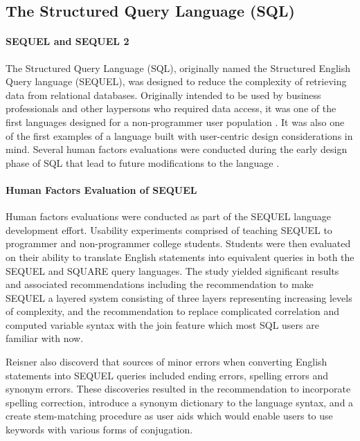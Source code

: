 \subsection{The Structured Query Language (SQL)}


\paragraph{SEQUEL and SEQUEL 2}
\cite{Chamberlin1974}
\cite{Astrahan1975}
The Structured Query Language (SQL), originally named the Structured English Query language (SEQUEL), was designed to reduce the complexity of retrieving data from relational databases. Originally intended to be used by business professionals and other laypersons who required data access, it was one of the first languages designed for a non-programmer user population \cite{Chamberlin1974, Chamberlin1976}. It was also one of the first examples of a language built with user-centric design considerations in mind. Several human factors evaluations were conducted during the early design phase of SQL that lead to future modifications to the language \cite{Reisner1977}.

\paragraph{Human Factors Evaluation of SEQUEL}
Human factors evaluations were conducted as part of the SEQUEL language development effort. Usability experiments comprised of teaching SEQUEL to programmer and non-programmer college students. Students were then evaluated on their ability to translate English statements into equivalent queries in both the SEQUEL and SQUARE query languages. The study yielded significant results and associated recommendations including the recommendation to make SEQUEL a layered system consisting of three layers representing increasing levels of complexity, and the recommendation to replace complicated correlation and computed variable syntax with the join feature which most SQL users are familiar with now.

Reisner also discoverd that sources of minor errors when converting English statements into SEQUEL queries included ending errors, spelling errors and synonym errors. These discoveries resulted in the recommendation to incorporate spelling correction, introduce a synonym dictionary to the language syntax, and a create stem-matching procedure as user aids which would enable users to use keywords with various forms of conjugation. \cite{Reisner1977}

